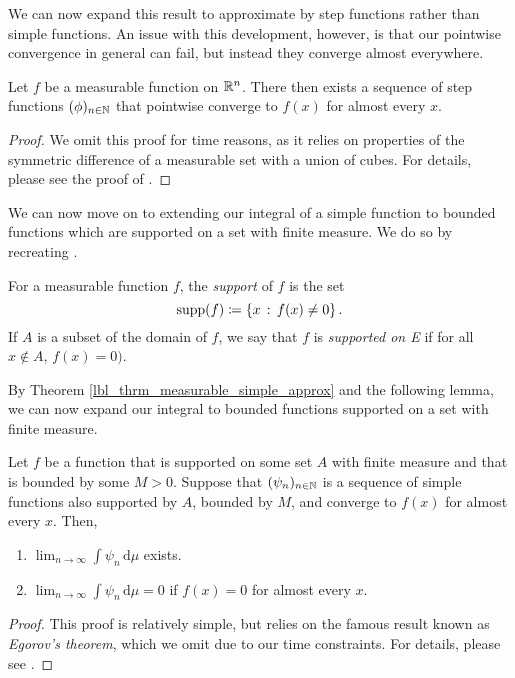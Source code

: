 We can now expand this result to approximate by step functions rather than simple functions. An issue with this development, however, is that our pointwise convergence in general can fail, but instead they converge almost everywhere.

\begin{theorem}
  Let $f$ be a measurable function on $\mathbb{R}^n$. There then exists a sequence of step functions $(\phi)_{n \in \mathbb{N}}$ that pointwise converge to $f(x)$ for almost every $x$.
\end{theorem}
\begin{proof}
  We omit this proof for time reasons, as it relies on properties of the symmetric difference of a measurable set with a union of cubes. For details, please see the proof of {\cite[Chapter 1, Theorem 4.3]{stein}}.
\end{proof}


We can now move on to extending our integral of a simple function to bounded functions which are supported on a set with finite measure. We do so by recreating {\cite[p.53-57]{stein}}.

\begin{definition}\label{lbl_def_support}
  For a measurable function $f$, the {\emph{support}} of $f$ is the set
  \begin{equation*}
    \text{supp}(f) \coloneqq \left\{x \,: \, f(x) \neq 0\right\}.
  \end{equation*}
  If $A$ is a subset of the domain of $f$, we say that $f$ is {\emph{supported on E}} if for all $x \not\in A$, $f(x) = 0)$.
\end{definition}

By Theorem \eqref{lbl_thrm_measurable_simple_approx} and the following lemma, we can now expand our integral to bounded functions supported on a set with finite measure.

\begin{lemma}\label{lbl_measurable__bounded_function_supported_finite_measure_approximation}
  Let $f$ be a function that is supported on some set $A$ with finite measure and that is bounded by some $M > 0$. Suppose that $(\psi_n)_{n \in \mathbb{N}}$ is a sequence of simple functions also supported by $A$, bounded by $M$, and converge to $f(x)$ for almost every $x$. Then,
  \begin{enumerate}[label = (\alph*)]
    \item $\lim_{n \to \infty} \int \psi_n \,\mathrm{d}\mu$ exists.
    \item $\lim_{n \to \infty} \int \psi_n \,\mathrm{d}\mu = 0$ if $f(x) = 0$ for almost every $x$.
  \end{enumerate}
\end{lemma}
\begin{proof}
  This proof is relatively simple, but relies on the famous result known as {\emph{Egorov's theorem}}, which we omit due to our time constraints. For details, please see {\cite[Chapter 2, Lemma 1.2]{stein}}.
\end{proof}

